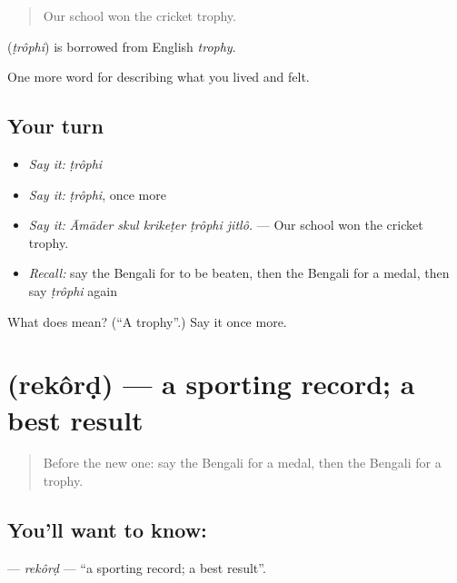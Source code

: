 \begin{quote}
Our school won the cricket trophy.
\end{quote}

\begin{cousinweb}
\textbf{} (\emph{ṭrôphi}) is borrowed from English \emph{trophy}.
\end{cousinweb}

\begin{grammarlens}[title={What you've built}]
One more word for describing what you lived and felt.
\end{grammarlens}

\subsection*{Your turn}
\begin{itemize}
\raggedright
  \item \emph{Say it:} \emph{ṭrôphi}
  \item \emph{Say it:} \emph{ṭrôphi}, once more
  \item \emph{Say it:} \emph{Āmāder skul krikeṭer ṭrôphi jitlô.} — Our school won the cricket trophy.
  \item \emph{Recall:} say the Bengali for to be beaten, then the Bengali for a medal, then say \emph{ṭrôphi} again
\end{itemize}

\begin{tcolorbox}[breakable,colback=teal!4,colframe=teal!35!black,title={Before you move on}]
What does  mean? (\textquotedblleft{}A trophy\textquotedblright{}.) Say it once more.
\end{tcolorbox}
\section[\texorpdfstring{\bn{রেকর্ড} (rekôrḍ)}{রেকর্ড (rekôrḍ)}]{ (rekôrḍ) — a sporting record; a best result}

\label{lesson:BN-C520-rekord}



\begin{quote}
Before the new one: say the Bengali for a medal, then the Bengali for a trophy.
\end{quote}

\subsection*{You'll want to know: }
\textbf{} — \emph{rekôrḍ} — \textquotedblleft{}a sporting record; a best result\textquotedblright{}.

